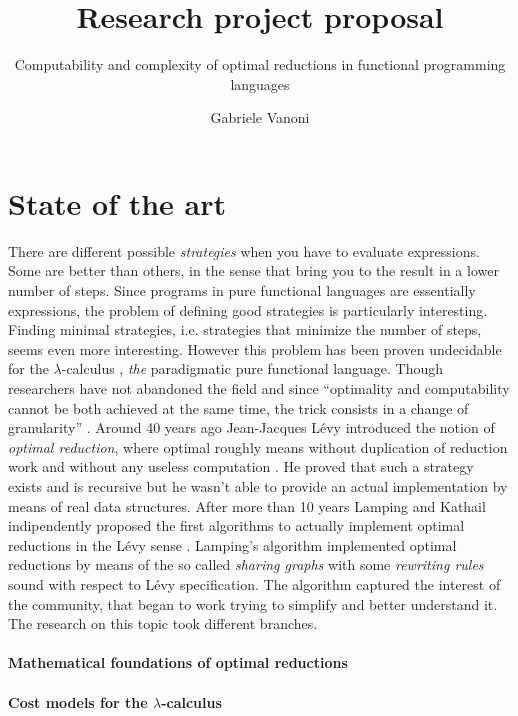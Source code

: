 \documentclass[english]{scrartcl}
\begin{document}
\title{Research project proposal}
\subtitle{Computability and complexity of optimal reductions in functional programming languages}
\author{Gabriele Vanoni}
\date{}
\maketitle
\section{State of the art}
There are different possible \emph{strategies} when you have to evaluate expressions. Some are better than others, in the sense that bring you to the result in a lower number of steps. Since programs in pure functional languages are essentially expressions, the problem of defining good strategies is particularly interesting. Finding minimal strategies, i.e. strategies that minimize the number of steps, seems even more interesting. However this problem has been proven undecidable for the $\lambda$-calculus \cite[Section~13.5]{barendregt_lambda_1984}, \emph{the} paradigmatic pure functional language. Though researchers have not abandoned the field and since ``optimality and computability cannot be both achieved at the same time, the trick consists in a change of granularity'' \cite{terese_term_2003}. Around 40 years ago Jean-Jacques Lévy introduced the notion of \emph{optimal reduction}, where optimal roughly means without duplication of reduction work and without any useless computation \cite{levy_reductions_1978}. He proved that such a strategy exists and is recursive but he wasn't able to provide an actual implementation by means of real data structures. After more than 10 years Lamping and Kathail indipendently proposed the first algorithms to actually implement optimal reductions in the Lévy sense  \cite{lamping_algorithm_1990,kathail_optimal_1990}. Lamping's algorithm implemented optimal reductions by means of the so called \emph{sharing graphs} with some \emph{rewriting rules} sound with respect to Lévy specification. The algorithm captured the interest of the community, that began to work trying to simplify and better understand it. The research on this topic took different branches.
\paragraph{Mathematical foundations of optimal reductions}
\paragraph{Cost models for the $\lambda$-calculus}
\end{document}
